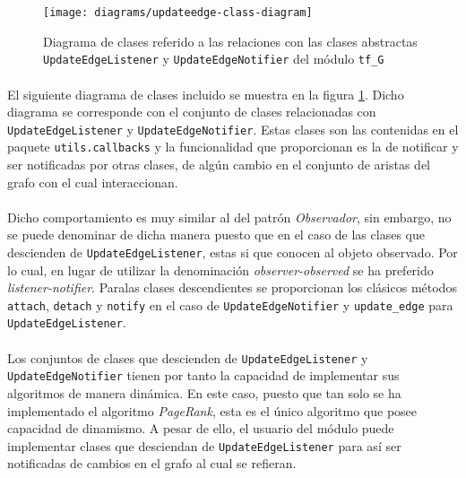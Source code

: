 \documentclass{subfiles}
\begin{document}
          \begin{figure}[h]
            \centering
            \texttt{[image: diagrams/updateedge-class-diagram]}
            \caption{Diagrama de clases referido a las relaciones con las clases abstractas \texttt{UpdateEdgeListener} y \texttt{UpdateEdgeNotifier} del módulo \texttt{tf\_G}}
            \label{img:update_edge_diagram}
          \end{figure}

          \paragraph{}
          El siguiente diagrama de clases incluido se muestra en la figura \ref{img:update_edge_diagram}. Dicho diagrama se corresponde con el conjunto de clases relacionadas con \texttt{UpdateEdgeListener} y \texttt{UpdateEdgeNotifier}. Estas clases son las contenidas en el paquete \texttt{utils.callbacks} y la funcionalidad que proporcionan es la de notificar y ser notificadas por otras clases, de algún cambio en el conjunto de aristas del grafo con el cual interaccionan.

          \paragraph{}
          Dicho comportamiento es muy similar al del patrón \emph{Observador}, sin embargo, no se puede denominar de dicha manera puesto que en el caso de las clases que descienden de \texttt{UpdateEdgeListener}, estas si que conocen al objeto observado. Por lo cual, en lugar de utilizar la denominación \emph{observer-observed} se ha preferido \emph{listener-notifier}. Paralas clases descendientes se proporcionan los clásicos métodos \texttt{attach}, \texttt{detach} y \texttt{notify} en el caso de \texttt{UpdateEdgeNotifier} y \texttt{update\_edge} para \texttt{UpdateEdgeListener}.

          \paragraph{}
          Los conjuntos de clases que descienden de \texttt{UpdateEdgeListener} y \texttt{UpdateEdgeNotifier} tienen por tanto la capacidad de implementar sus algoritmos de manera dinámica. En este caso, puesto que tan solo se ha implementado el algoritmo \emph{PageRank}, esta es el único algoritmo que posee capacidad de dinamismo. A pesar de ello, el usuario del módulo puede implementar clases que desciendan de \texttt{UpdateEdgeListener} para así ser notificadas de cambios en el grafo al cual se refieran.
\end{document}
